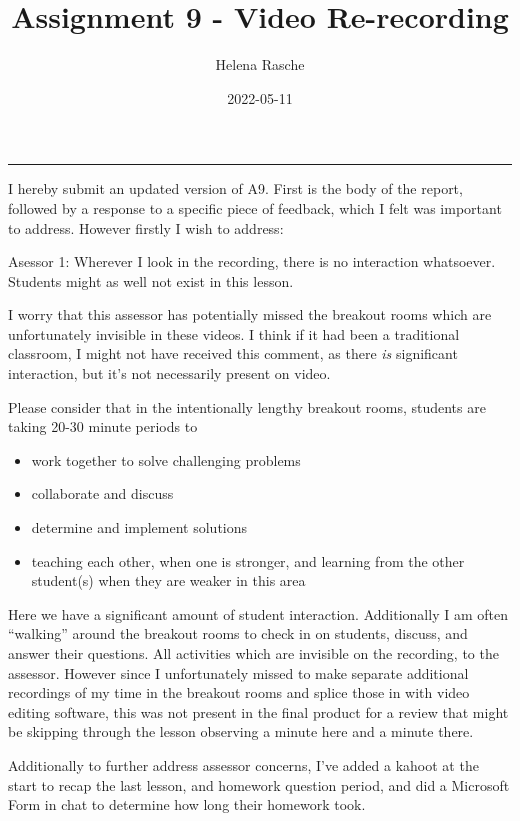 \documentclass[paper=a4,justified,a4paper]{tufte-handout}
\title[A9 - Video Re-recording]{Assignment 9 - Video Re-recording}
\author{Helena Rasche}
\date{2022-05-11}
\providecommand{\tightlist}{%
  \setlength{\itemsep}{0pt}\setlength{\parskip}{0pt}}
\begin{document}
\maketitle
\noindent\rule{5in}{0.4pt}


I hereby submit an updated version of A9. First is the body of the
report, followed by a response to a specific piece of feedback, which I
felt was important to address. However firstly I wish to address:

\begin{myquote}
Asessor 1: Wherever I look in the recording, there is no interaction whatsoever.
Students might as well not exist in this lesson.
\end{myquote}

I worry that this assessor has potentially missed the breakout rooms
which are unfortunately invisible in these videos. I think if it had
been a traditional classroom, I might not have received this comment, as
there \emph{is} significant interaction, but it's not necessarily
present on video.

Please consider that in the intentionally lengthy breakout rooms,
students are taking 20-30 minute periods to

\begin{itemize}
\tightlist
\item
  work together to solve challenging problems
\item
  collaborate and discuss
\item
  determine and implement solutions
\item
  teaching each other, when one is stronger, and learning from the other
  student(s) when they are weaker in this area
\end{itemize}

Here we have a significant amount of student interaction. Additionally I
am often ``walking'' around the breakout rooms to check in on students,
discuss, and answer their questions. All activities which are invisible
on the recording, to the assessor. However since I unfortunately missed
to make separate additional recordings of my time in the breakout rooms
and splice those in with video editing software, this was not present in
the final product for a review that might be skipping through the lesson
observing a minute here and a minute there.

Additionally to further address assessor concerns, I've added a kahoot
at the start to recap the last lesson, and homework question period, and
did a Microsoft Form in chat to determine how long their homework took.
\end{document}
